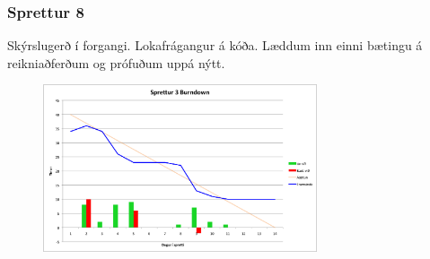 \documentclass{article}
\begin{document}
\subsubsection{Sprettur 8}
Skýrslugerð í forgangi. Lokafrágangur á kóða. Læddum inn einni
bætingu á reikniaðferðum og prófuðum uppá nýtt.
\begin{figure}[H]
 \centering
 \includegraphics[width=0.72\textwidth]{Sprettur3_Burndown.png}
 \caption{}
\label{fig:sp8}
\end{figure}

\hfil \\
\hfil \\
\hfil \\
\hfil \\

\end{document}
